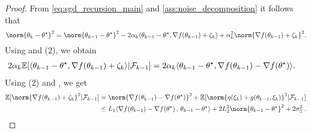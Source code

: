 \begin{proof}
From \eqref{eq:sgd_recursion_main} and \cref{ass:noise_decomposition} it follows that 
    \begin{equation}
        \norm{\theta_k-\thetas}^2 = \norm{\theta_{k-1}-\thetas}^2-2\alpha_k\langle \theta_{k-1}-\thetas , \nabla f(\theta_{k-1})+\zeta_k\rangle + \alpha_k^2\norm{\nabla f(\theta_{k-1})+\zeta_k}^2.
    \end{equation}
    Using  and ($2$), we obtain
    \begin{align}
    2\alpha_k\mathbb{E}[\langle \theta_{k-1}-\theta^\star , \nabla f(\theta_{k-1})+\zeta_k\rangle|\mathcal{F}_{k-1}]
    &= 2\alpha_k\langle \theta_{k-1}-\theta^\star , \nabla f(\theta_{k-1})-\nabla f(\theta^\star) \rangle.     
    \end{align}
    Using ($2$) and , we get 
    \begin{align}
        \PE[\norm{\nabla f(\theta_{k-1})+\zeta_k}^2|\mathcal{F}_{k-1}] 
        &= \norm{\nabla f(\theta_{k-1})-\nabla f(\thetas)}^2 + \PE[\norm{\eta(\xi_k) + g(\theta_{k-1}, \xi_k)}^2|\mathcal{F}_{k-1}] \\ &\leq  L_1 \pscal{\nabla f(\theta_{k-1}) - \nabla f(\thetas)}{\theta_{k-1}- \thetas} + 2L_2^2 \norm{\theta_{k-1}-\thetas}^2 + 2\sigma_2^2\eqsp.
    \end{align}


\end{proof}
